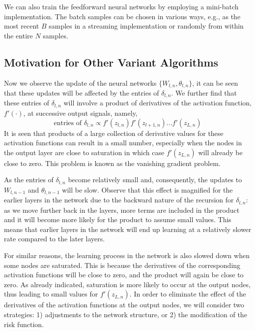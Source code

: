 \documentclass[journal,a4paper,onecolumn,11pt]{IEEEtran}
\begin{document}
We can also train the feedforward neural networks by employing a mini-batch implementation. The batch samples can be chosen in various ways, e.g., as the most recent $B$ samples in a streaming implementation or randomly from within the entire $N$ samples.

\subsection{Motivation for Other Variant Algorithms}
Now we observe the update of the neural networks $\{W_{l,n}, \theta_{l,n}\}$, it can be seen that these updates will be affected by the entries of $\delta_{l,n}$. We further find that these entries of $\delta_{l,n}$ will involve a product of derivatives of the activation function, $f'(\cdot)$, at successive output signals, namely,
\begin{equation}
\text{entries of } \delta_{l,n} \propto f'(z_{l,n})f'(z_{l+1,n})...f'(z_{L,n})
\end{equation}
It is seen that products of a large collection of derivative values for these activation functions can result in a small number, especially when the nodes in the output layer are close to saturation in which case $f'(z_{L,n})$ will already be close to zero. This problem is known as the vanishing gradient problem.

As the entries of $\delta_{l,n}$ become relatively small and, consequently, the updates to $W_{l,n-1}$ and $\theta_{l,n-1}$ will be slow. Observe that this effect is magnified for the earlier layers in the network due to the backward nature of the recursion for $\delta_{l,n}$: as we move further back in the layers, more terms are included in the product and it will become more likely for the product to assume small values. This means that earlier layers in the network will end up learning at a relatively slower rate compared to the later layers.

For similar reasons, the learning process in the network is also slowed down when some nodes are saturated. This is because the derivatives of the corresponding activation functions will be close to zero, and the product will again be close to zero. As already indicated, saturation is more likely to occur at the output nodes, thus leading to small values for $f'(z_{L,n})$. In order to eliminate the effect of the derivatives of the activation functions at the output nodes, we will consider two strategies: 1) adjustments to the network structure, or 2) the modification of the risk function.
\end{document}
